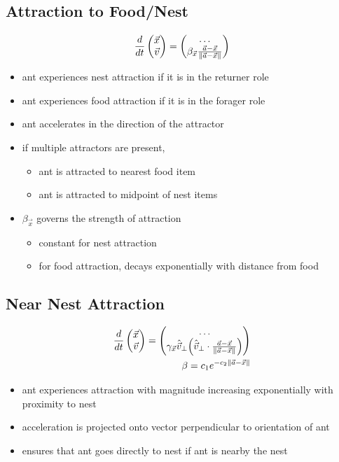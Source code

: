 \subsection{Attraction to Food/Nest}
\begin{align*}
\frac{d}{dt} \begin{pmatrix}\vec{x}\\\vec{v}\end{pmatrix} = \begin{pmatrix}\hdots \\ \beta_{\vec{x}} \frac{\vec{a} - \vec{x}}{\lVert\vec{a} - \vec{x}\rVert} \end{pmatrix}
\end{align*}
\begin{itemize}
	\item ant experiences nest attraction if it is in the returner role
    \item ant experiences food attraction if it is in the forager role
	\item ant accelerates in the direction of the attractor
    \item if multiple attractors are present,
    \begin{itemize}
		\item ant is attracted to nearest food item
        \item ant is attracted to midpoint of nest items
    \end{itemize}
    \item $\beta_{\vec{x}}$ governs the strength of attraction
    \begin{itemize}
    	\item constant for nest attraction
        \item for food attraction, decays exponentially with distance from food
    \end{itemize}
\end{itemize}

\subsection{Near Nest Attraction}
\begin{align*}
\frac{d}{dt} \begin{pmatrix}\vec{x}\\\vec{v}\end{pmatrix} = \begin{pmatrix}
\hdots \\
\gamma_{\vec{x}} \hat{\vec{v}}_{\perp} \Big( \hat{\vec{v}}_{\perp} \cdot \frac{\vec{a} - \vec{x}}{\lVert\vec{a} - \vec{x}\rVert} \Big)
\end{pmatrix}  \\
\beta = c_1e^{-c_2\lVert\vec{a} - \vec{x}\rVert}
\end{align*}
\begin{itemize}
	\item ant experiences attraction with magnitude increasing exponentially with proximity to nest
    \item acceleration is projected onto vector perpendicular to orientation of ant
	\item ensures that ant goes directly to nest if ant is nearby the nest
\end{itemize}


